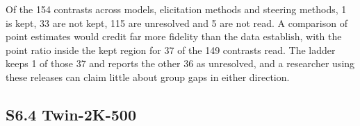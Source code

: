 Of the 154 contrasts across models, elicitation methods and steering methods, 1 is kept, 33 are not kept, 115 are unresolved and 5 are not read. %
A comparison of point estimates would credit far more fidelity than the data establish, with the point ratio inside the kept region for 37 of the 149 contrasts read. %
The ladder keeps 1 of those 37 and reports the other 36 as unresolved, and a researcher using these releases can claim little about group gaps in either direction. %

\subsection*{S6.4 Twin-2K-500}

